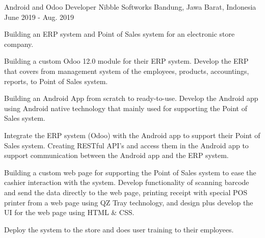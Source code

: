 

\begin{cventries}

  \cventry
    {Android and Odoo Developer} %
    {Nibble Softworks} %
    {Bandung, Jawa Barat, Indonesia} %
    {June 2019 - Aug. 2019} %
    {
      \begin{cvitems} %
        \item Building an ERP system and Point of Sales system for an electronic store company.
        \item Building a custom Odoo 12.0 module for their ERP system. Develop the ERP that covers from management system of the employees, products, accountings, reports, to Point of Sales system.
        \item Building an Android App from scratch to ready-to-use. Develop the Android app using Android native technology that mainly used for supporting the Point of Sales system.
        \item Integrate the ERP system (Odoo) with the Android app to support their Point of Sales system. Creating RESTful API's and access them in the Android app to support communication between the Android app and the ERP system.
        \item Building a custom web page for supporting the Point of Sales system to ease the cashier interaction with the system. Develop functionality of scanning barcode and send the data directly to the web page, printing receipt with special POS printer from a web page using QZ Tray technology, and design plus develop the UI for the web page using HTML & CSS.
        \item Deploy the system to the store and does user training to their employees.
      \end{cvitems}
    }


\end{cventries}
